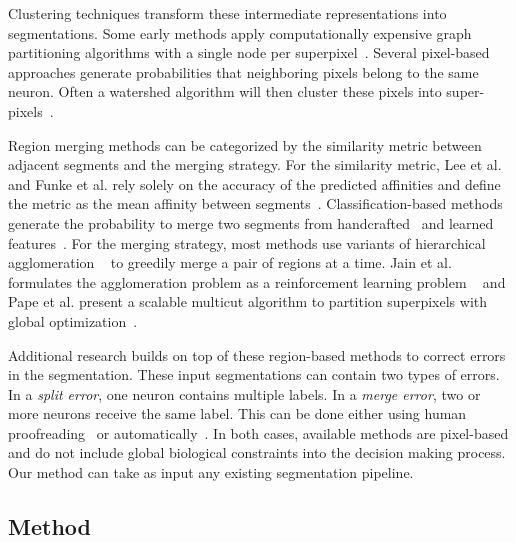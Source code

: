 Clustering techniques transform these intermediate representations into segmentations.
Some early methods apply computationally expensive graph partitioning algorithms with a single node per superpixel~\cite{andres2012globally}.
Several pixel-based approaches generate probabilities that neighboring pixels belong to the same neuron.
Often a watershed algorithm will then cluster these pixels into super-pixels~\cite{zlateski2015image}.

Region merging methods can be categorized by the similarity metric between adjacent segments and the merging strategy.
For the similarity metric, Lee et al. and Funke et al. rely solely on the accuracy of the predicted affinities and define the metric as the mean affinity between segments~\cite{funke2017deep,lee2017superhuman}.
Classification-based methods generate the probability to merge two segments from handcrafted~\cite{jain2011learning,seymour2016rhoananet,nunez2014graph,10.1371/journal.pone.0125825,parag2017anisotropic,zlateski2015image} and learned features~\cite{bogovic2013learned}. 
For the merging strategy, most methods use variants of hierarchical agglomeration ~\cite{seymour2016rhoananet,nunez2014graph,10.1371/journal.pone.0125825,parag2017anisotropic,zlateski2015image} to greedily merge a pair of regions at a time.
Jain et al. formulates the agglomeration problem as a reinforcement learning problem ~\cite{jain2011learning} and Pape et al. present a scalable multicut algorithm to partition superpixels with global optimization~\cite{beier2017multicut}.

Additional research builds on top of these region-based methods to correct errors in the segmentation. 
These input segmentations can contain two types of errors.
In a \textit{split error}, one neuron contains multiple labels.
In a \textit{merge error}, two or more neurons receive the same label.
This can be done either using human proofreading~\cite{haehn2017guided,haehn2014design,mojo2} or automatically~\cite{rolnick2017morphological,error_correction_using_CNN}. 
In both cases, available methods are pixel-based and do not include global biological constraints into the decision making process. 
Our method can take as input any existing segmentation pipeline.

\subsection{Method}

